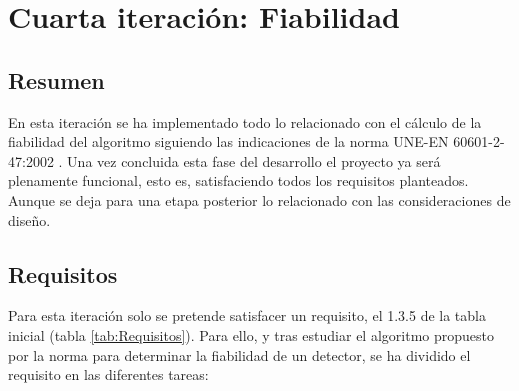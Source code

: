 
\section{Cuarta iteración: Fiabilidad}
    \subsection{Resumen}
        
        En esta iteración se ha implementado todo lo relacionado con el cálculo de la fiabilidad del algoritmo siguiendo las indicaciones de la norma UNE-EN 60601-2-47:2002 \cite{Aenor2002}. Una vez concluida esta fase del desarrollo el proyecto ya será plenamente funcional, esto es, satisfaciendo todos los requisitos planteados. Aunque se deja para una etapa posterior lo relacionado con las consideraciones de diseño.
        
    \subsection{Requisitos}
    
        Para esta iteración solo se pretende satisfacer un requisito, el 1.3.5 de la tabla inicial (tabla \ref{tab:Requisitos}). Para ello, y tras estudiar el algoritmo propuesto por la norma para determinar la fiabilidad de un detector, se ha dividido el requisito en las diferentes tareas:
        
